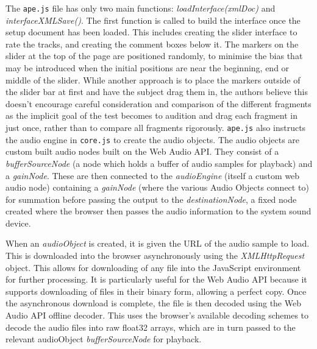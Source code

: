 \documentclass{article}
\begin{document}
The \texttt{ape.js} file has only two main functions: \textit{loadInterface(xmlDoc)} and \textit{interfaceXMLSave()}. The first function is called to build the interface once the setup document has been loaded. This includes creating the slider interface to rate the tracks, and creating the comment boxes below it. The markers on the slider at the top of the page are positioned randomly, to minimise the bias that may be introduced when the initial positions are near the beginning, end or middle of the slider. While another approach is to place the markers outside of the slider bar at first and have the subject drag them in, the authors believe this doesn't encourage careful consideration and comparison of the different fragments as the implicit goal of the test becomes to audition and drag each fragment in just once, rather than to compare all fragments rigorously. 
\texttt{ape.js} also instructs the audio engine in \texttt{core.js} to create the audio objects. The audio objects are custom built audio nodes built on the Web Audio API. %
They consist of a \textit{bufferSourceNode} (a node which holds a buffer of audio samples for playback) and a \textit{gainNode}. These are then connected to the \textit{audioEngine} (itself a custom web audio node) containing a \textit{gainNode} (where the various Audio Objects connect to) for summation before passing the output to the \textit{destinationNode}, a fixed node created where %
the browser then passes the audio information to the system sound device. 

When an \textit{audioObject} is created, it is given the URL of the audio sample to load. This is downloaded into the browser asynchronously using the \textit{XMLHttpRequest} object. This allows for downloading of any file into the JavaScript environment for further processing. It is particularly useful for the Web Audio API because it supports downloading of files in their binary form, allowing a perfect copy. %
Once the asynchronous download is complete, the file is then decoded using the Web Audio API offline decoder. This uses the browser's %
 available decoding schemes to decode the audio files into raw float32 arrays, which are in turn passed to the relevant audioObject \textit{bufferSourceNode} for playback.
\end{document}
